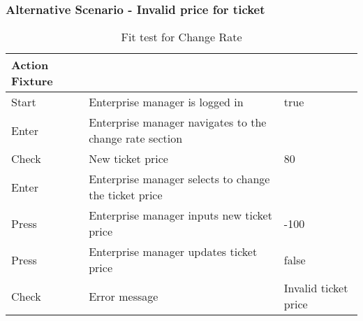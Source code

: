 \subsubsection{Alternative Scenario - Invalid price for ticket}
\begin{table}[H]
    \centering
    \begin{tabular}{| l | l | l |}
        \hline
        \textbf{Action Fixture} &                                                               &       \\\hline
        Start                   & Enterprise manager is logged in                               & true  \\\hline
        Enter                   & Enterprise manager navigates to the change rate section       &       \\\hline
        Check                   & New ticket price                                              & 80    \\\hline
        Enter                   & Enterprise manager selects to change the ticket price         &       \\\hline
        Press                   & Enterprise manager inputs new ticket price                    & -100  \\\hline
        Press                   & Enterprise manager updates ticket price                       & false \\\hline
        Check                   & Error message                                                 & Invalid ticket price \\\hline
    \end{tabular}
    \caption{Fit test for Change Rate}
\end{table}
